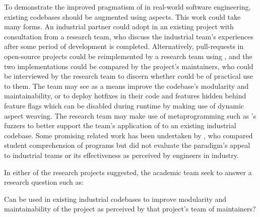 To demonstrate the improved pragmatism of \aop{} in real-world software
engineering, existing codebases should be augmented using aspects. This work
could take many forms. An industrial partner could adopt \aop{} in an existing
project with consultation from a research team, who discuss the industrial
team's experiences after some period of \aspectoriented development is
completed. Alternatively, pull-requests in open-source projects could be
reimplemented by a research team using \aspectorientation{}, and the two
implementations could be compared by the project's maintainers, who could be
interviewed by the research team to discern whether \aop{} could be of practical
use to them. The team may see \aop{} as a means improve the codebase's
modularity and maintainability, or to deploy hotfixes in their code and features
hidden behind feature flags which can be disabled during runtime by making use
of dynamic aspect weaving. The research team may make use of
\aspectoriented{}
metaprogramming such as \pdsf{}'s fuzzers to better support the team's
application of \aop{} to an existing industrial codebase. Some promising related
work has been undertaken by \citet{przybylek2018empirical}, who compared student
comprehension of \aspectoriented{} programs but did not evaluate the paradigm's
appeal to industrial teams or its effectiveness as perceived by engineers in
industry.  

In either of the research projects suggested, the academic team seek to answer a
research question such as:

\begin{researchquestion}
Can \aop{} be used in existing industrial codebases to improve modularity and
maintainability of the project as perceived by that project's team of maintainers?
\end{researchquestion}



